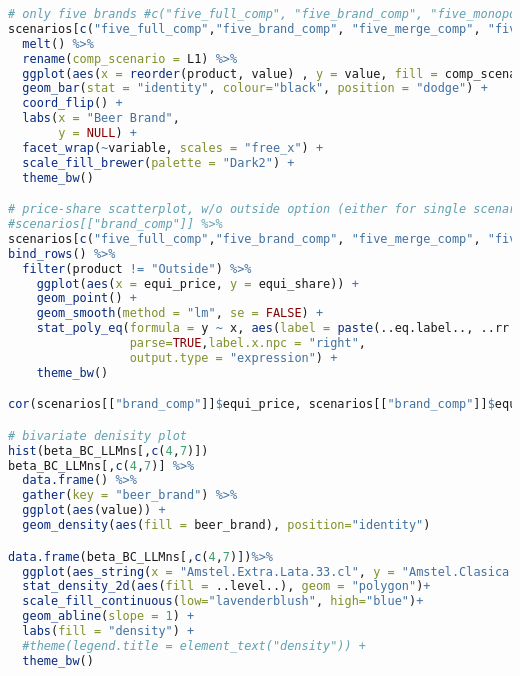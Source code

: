 \begin{lstlisting}[language=R,caption={Plotting correlations, beta densities, histograms, market outcomes, and a price-market share scatterplot}, label=lst_plotting]
 # only five brands #c("five_full_comp", "five_brand_comp", "five_monopoly", "five_merge_comp")
scenarios[c("five_full_comp","five_brand_comp", "five_merge_comp", "five_monopoly")] %>% 
  melt() %>% 
  rename(comp_scenario = L1) %>% 
  ggplot(aes(x = reorder(product, value) , y = value, fill = comp_scenario)) +
  geom_bar(stat = "identity", colour="black", position = "dodge") +
  coord_flip() +
  labs(x = "Beer Brand",
       y = NULL) +
  facet_wrap(~variable, scales = "free_x") +
  scale_fill_brewer(palette = "Dark2") +
  theme_bw()

# price-share scatterplot, w/o outside option (either for single scenario or all)
#scenarios[["brand_comp"]] %>% 
scenarios[c("five_full_comp","five_brand_comp", "five_merge_comp", "five_monopoly")] %>% 
bind_rows() %>% 
  filter(product != "Outside") %>% 
    ggplot(aes(x = equi_price, y = equi_share)) +
    geom_point() +
    geom_smooth(method = "lm", se = FALSE) +
    stat_poly_eq(formula = y ~ x, aes(label = paste(..eq.label.., ..rr.label.., sep = "~~~~~~")), 
                 parse=TRUE,label.x.npc = "right",
                 output.type = "expression") +
    theme_bw()

cor(scenarios[["brand_comp"]]$equi_price, scenarios[["brand_comp"]]$equi_share)

# bivariate denisity plot
hist(beta_BC_LLMns[,c(4,7)])
beta_BC_LLMns[,c(4,7)] %>% 
  data.frame() %>% 
  gather(key = "beer_brand") %>% 
  ggplot(aes(value)) +
  geom_density(aes(fill = beer_brand), position="identity")

data.frame(beta_BC_LLMns[,c(4,7)])%>% 
  ggplot(aes_string(x = "Amstel.Extra.Lata.33.cl", y = "Amstel.Clasica.Lata.33.cl")) +
  stat_density_2d(aes(fill = ..level..), geom = "polygon")+
  scale_fill_continuous(low="lavenderblush", high="blue")+
  geom_abline(slope = 1) +
  labs(fill = "density") +
  #theme(legend.title = element_text("density")) +
  theme_bw()

\end{lstlisting}